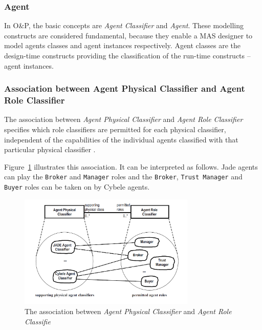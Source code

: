 \subsubsection*{Agent}

In O\&P, the basic concepts are \textit{Agent Classifier} and \textit{Agent}.
These modelling constructs are considered fundamental, because they enable a MAS designer to model agents classes and agent instances respectively.
Agent classes are the design-time constructs providing the classification of the run-time constructs -- agent instances.

\subsubsection*{Association between Agent Physical Classifier and Agent Role Classifier}

The association between \textit{Agent Physical Classifier} and \textit{Agent Role Classifier} specifies which role classifiers are permitted for each physical classifier, independent of the capabilities of the individual agents classified with that particular physical classifier \cite{Odell05}.

Figure~\ref{figure:onp-physical-classifier-role-classifier-association} illustrates this association.
It can be interpreted as follows. Jade agents can play the \texttt{Broker} and \texttt{Manager} roles and the \texttt{Broker}, \texttt{Trust Manager} and \texttt{Buyer} roles can be taken on by Cybele agents.

\begin{figure}[ht]
	\centering
	\includegraphics[width=0.75\textwidth]{images/onp/physical-classifier-role-classifier-association.png}
	\caption{The association between \textit{Agent Physical Classifier} and \textit{Agent Role Classifie}}
	\label{figure:onp-physical-classifier-role-classifier-association}
\end{figure}

